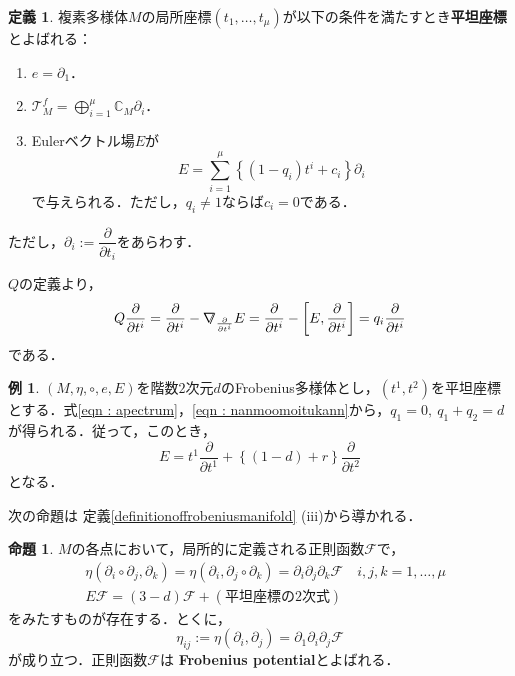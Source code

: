 \documentclass[a4paper,11pt]{jbook}
\theoremstyle{plain}
\theoremstyle{definition}
\newtheorem{prop}[thm]{命題}
\newtheorem{defn}[thm]{定義}
\newtheorem{exmp}[thm]{例}
\theoremstyle{remark}
\theoremstyle{proof}
\numberwithin{equation}{section}
\def\CC{{\mathbb C}}
\def\F{{\mathcal F}}
\def\T{{\mathcal T}}
\def\p{{\partial }}
\def\p{\partial }
\def\ns{{\nabla}\hspace{-1.4mm}\raisebox{0.3mm}{\text{\footnotesize{\bf /}}}}
\begin{document}
\begin{defn}
\label{defn:flatcoordinate}
複素多様体$M$の局所座標$(t_1,\dots,t_{\mu})$が以下の条件を満たすとき{\bf 平坦座標}とよばれる：
\begin{enumerate}
\item $e=\p_1$．
\item $\displaystyle\T_M^f=\bigoplus_{i=1}^\mu\CC_M\p_i$．
\item Eulerベクトル場$E$が
\begin{equation}
E=\sum_{i=1}^\mu\left\{ (1-q_i)t^i+c_i\right\}\p_i
\end{equation}
で与えられる．ただし，$q_i\not= 1$ならば$c_i=0$である．
\end{enumerate}
ただし，$\p_i:=\dfrac{\p}{\p t_i}$をあらわす．
\end{defn}
$Q$の定義より，
\begin{equation}
\label{eqn : apectrum}
Q\dfrac{\p}{\p t^{i}}=\dfrac{\p}{\p t^{i}}-\ns_{\frac{\p}{\p t^{i}}}E=\dfrac{\p}{\p t^{i}}-\left[ E,\dfrac{\p}{\p t^{i}} \right]=q_{i}\dfrac{\p}{\p t^{i}}
\end{equation}
である．
\begin{exmp}
\label{exmp : Euler vector  field}
$(M,\eta,\circ,e,E)$を階数$2$次元$d$のFrobenius多様体とし，$(t^{1},t^{2})$を平坦座標とする．式\eqref{eqn : apectrum}，\ref{eqn : nanmoomoitukann}から，$q_{1}=0,~q_{1}+q_{2}=d$が得られる．従って，このとき，
\begin{equation}
\label{eqn : Euler vector field of rank 2 Frobenius manifold}
E=t^{1}\dfrac{\p}{\p t^{1}}+\left\{ (1-d)+r\right\}\dfrac{\p}{\p t^{2}}
\end{equation}
となる．
\end{exmp}


次の命題は 定義\ref{definitionoffrobeniusmanifold} {\rm (iii)}から導かれる．

\begin{prop}
\label{prop:potential}
$M$の各点において，局所的に定義される正則函数$\F$で，
\begin{align}
&\label{metric nad potential} \eta(\p_i\circ\p_j,\p_k)=\eta(\p_i,\p_j\circ\p_k)=\p_i\p_j\p_k \F
\quad i,j,k=1,\dots,\mu \\
& \label{Eulervectorfieldandpotential} E\F=(3-d)\F+(\text{平坦座標の$2$次式})
\end{align}
をみたすものが存在する．とくに，
\begin{equation}
\eta_{ij}:=\eta(\p_i,\p_j)=\p_1\p_i\p_j \F
\end{equation}
が成り立つ．正則函数$\F$は {\bf Frobenius potential}とよばれる．
\end{prop}
\end{document}
